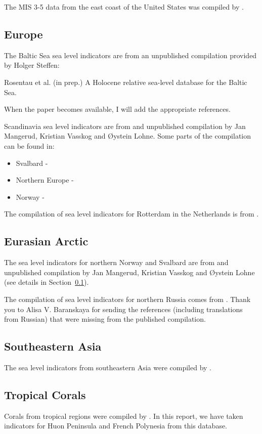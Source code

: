 The MIS 3-5 data from the east coast of the United States was compiled by \citet{PicoEtal2017}.

\subsection{Europe}

\label{sec:Europe}

The Baltic Sea sea level indicators are from an unpublished compilation provided by Holger Steffen:

Rosentau et al. (in prep.) A Holocene relative sea-level database for the Baltic Sea.

When the paper becomes available, I will add the appropriate references.

Scandinavia sea level indicators are from and unpublished compilation by Jan Mangerud, Kristian Vasskog and \O{}ystein Lohne. Some parts of the compilation can be found in:

\begin{itemize}
  \item Svalbard - \citet{BondevikEtal1995}
  \item Northern Europe - \citet{FormanEtal2004}
  \item Norway - \citet{LohneEtal2007,RomundsetEtal2010,RomundsetEtal2011,RomundsetEtal2015,RomundsetEtal2018,VasskogEtal2019}
\end{itemize}

The compilation of sea level indicators for Rotterdam in the Netherlands is from \citet{HijmaCohen2019}.


\subsection{Eurasian Arctic}

The sea level indicators for northern Norway and Svalbard are from and unpublished compilation by Jan Mangerud, Kristian Vasskog and \O{}ystein Lohne (see details in Section~\ref{sec:Europe}).

The compilation of sea level indicators for northern Russia comes from \citet{BaranskayaEtal2018}. Thank you to Alisa V. Baranskaya for sending the references (including translations from Russian) that were missing from the published compilation.

\subsection{Southeastern Asia}

The sea level indicators from southeastern Asia were compiled by \citet{MannEtal2019}.

\subsection{Tropical Corals}

Corals from tropical regions were compiled by \citet{HibbertEtal2016}. In this report, we have taken indicators for Huon Peninsula and French Polynesia from this database.

